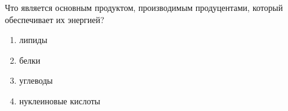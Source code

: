 
Что
является основным продуктом, производимым продуцентами, который обеспечивает их
энергией?

\begin{enumerate}
    \item липиды
    \item белки 
    \item углеводы 
    \item нуклеиновые кислоты
\end{enumerate}

